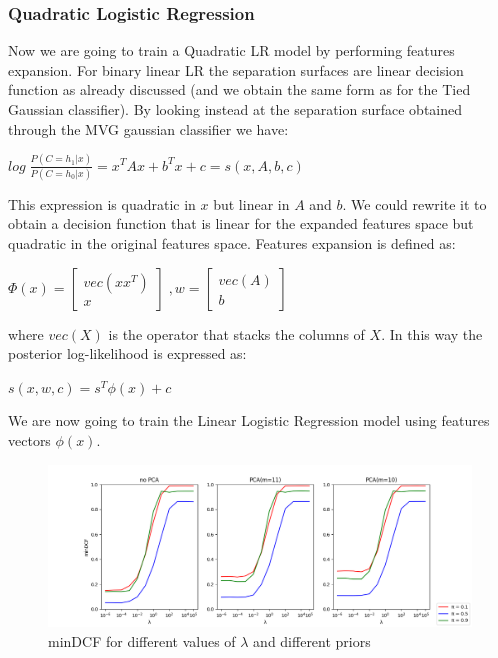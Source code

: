 \documentclass[10pt, a4paper, twocolumn]{article} %
\begin{document}
\subsubsection{Quadratic Logistic Regression}
Now we are going to train a Quadratic LR model by performing features expansion.
For binary linear LR the separation surfaces are linear decision function as already discussed (and
we obtain the same form as for the Tied Gaussian classifier). By looking instead at the separation surface
obtained through the MVG gaussian classifier we have:
\begin{center}
	\begin{math}
		log\;\frac{P(C=h_1|x)}{P(C=h_0|x)} = x^TAx + b^Tx + c = s(x, A, b, c)
	\end{math}
\end{center}
This expression is quadratic in $x$ but linear in $A$ and $b$. 
We could rewrite it to obtain a decision function that is linear for the expanded features space
but quadratic in the original features space. Features expansion is defined as:
\begin{center}
	\begin{math}
		\Phi(x) = \begin{bmatrix}
					vec(xx^T)\\
					x
				  \end{bmatrix} \;, 
		w= 		 \begin{bmatrix}
					vec(A)\\
					b
				  \end{bmatrix}
	\end{math}
\end{center}
where $vec(X)$ is the operator that stacks the columns of $X$. In this way the posterior log-likelihood is expressed as:
\begin{center}
	\begin{math}
		s(x, w, c) = s^T\phi(x)+c
	\end{math}
\end{center}
We are now going to train the Linear Logistic Regression model using features vectors $\phi(x)$.\\
\begin{figure}[ht!]
	\includegraphics[width=\linewidth]{./Pictures/FeaturesAnalysis/dcfplotQLR.png}
	\caption{minDCF for different values of $\lambda$ and different priors}
	\label{dcfQLR} 
\end{figure}
\end{document}
